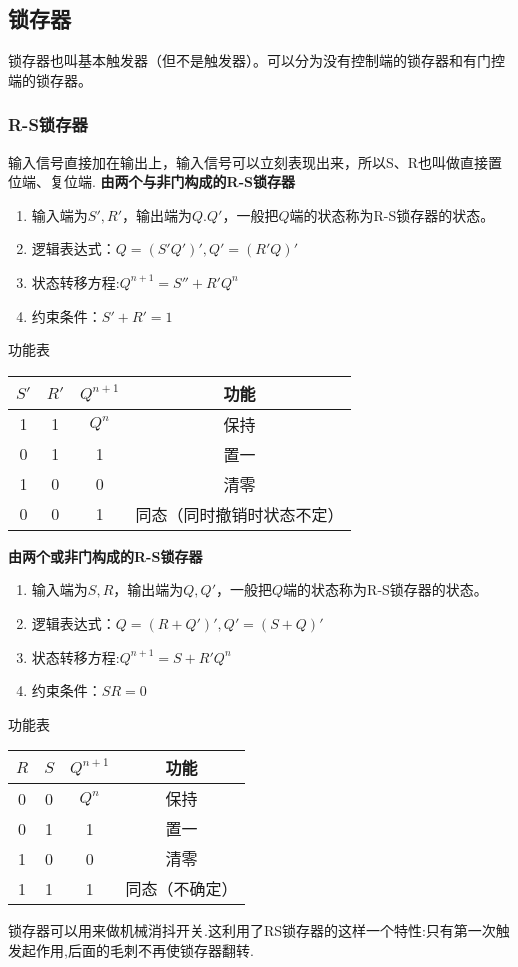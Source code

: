 \documentclass{ctexart}
\newcommand*{\noindbf}[1]{{\noindent \bf{#1} \qquad}}
\begin{document}
\subsection{锁存器}
锁存器也叫基本触发器（但不是触发器）。可以分为没有控制端的锁存器和有门控端的锁存器。
\subsubsection{R-S锁存器}
输入信号直接加在输出上，输入信号可以立刻表现出来，所以S、R也叫做直接置位端、复位端.
\noindbf{由两个与非门构成的R-S锁存器} 
\begin{enumerate}
    \item 输入端为$S',R'$，输出端为$Q.Q'$，一般把$Q$端的状态称为R-S锁存器的状态。
    \item 逻辑表达式：$Q=(S'Q')',Q'=(R'Q)'$
    \item 状态转移方程:$Q^{n+1}=S''+R'Q^n$
    \item 约束条件：$S'+R'=1$
\end{enumerate}
功能表
\begin{table}[H]
    \centering
    \begin{tabular}{cc|c|c}
        \hline
        $S'$ & $R'$ & $Q^{n+1}$ & 功能\\ \hline
        1&1&$Q^n$&保持\\
        0&1&1&置一\\
        1&0&0&清零\\
        0&0&1&同态（同时撤销时状态不定）\\ \hline
    \end{tabular}
\end{table}

\noindbf{由两个或非门构成的R-S锁存器} 
\begin{enumerate}
    \item 输入端为$S,R$，输出端为$Q,Q'$，一般把$Q$端的状态称为R-S锁存器的状态。
    \item 逻辑表达式：$Q=(R+Q')',Q'=(S+Q)'$
    \item 状态转移方程:$Q^{n+1}=S+R'Q^n$
    \item 约束条件：$SR=0$
\end{enumerate}
功能表
\begin{table}[H]
    \centering
    \begin{tabular}{cc|c|c}
        \hline
        $R$ & $S$ & $Q^{n+1}$ & 功能\\ \hline
        0&0&$Q^n$&保持\\
        0&1&1&置一\\
        1&0&0&清零\\
        1&1&1&同态（不确定）\\ \hline
    \end{tabular}
\end{table}
锁存器可以用来做机械消抖开关.这利用了RS锁存器的这样一个特性:只有第一次触发起作用,后面的毛刺不再使锁存器翻转.
\end{document}

